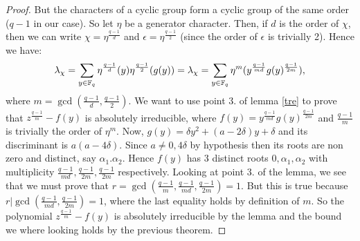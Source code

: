 \begin{cor}
\begin{proof}
But the characters of a cyclic group form a cyclic group of the same order ($q-1$ in our case). So let $\eta$ be a generator character.
Then, if $d$ is the order of $\chi$, then we can write $\chi=\eta^{\frac{q-1}{d}}$ and $\epsilon=\eta^{\frac{q-1}{2}}$
(since the order of $\epsilon$ is trivially 2). Hence we have:
\begin{equation}
	\lambda_{\chi}=\sum_{y \in {\mathbb F}_q} \eta^{\frac{q-1}{d}}(y)\eta^{\frac{q-1}{2}}(g(y))=\lambda_{\chi}=\sum_{y \in {\mathbb F}_q}
	\eta^m(y^{\frac{q-1}{md}}g(y)^{\frac{q-1}{2m}}),
\end{equation}
where $m=\gcd(\frac{q-1}{d},\frac{q-1}{2})$. We want to use point 3. of lemma \ref{tre} to prove that $z^{\frac{q-1}{m}}-f(y)$
is absolutely irreducible, where $f(y)=y^{\frac{q-1}{md}}g(y)^{\frac{q-1}{2m}}$ and $\frac{q-1}{m}$ is trivially the order
of $\eta^m$. Now, $g(y)=\delta y^2+(a-2\delta)y+\delta$
and its discriminant is $a(a-4\delta)$. Since $a\neq 0, 4\delta$ by hypothesis then its roots are non zero
and distinct, say $\alpha_1. \alpha_2$. Hence $f(y)$ has 3 distinct roots $0,\alpha_1,\alpha_2$ with multiplicity 
$\frac{q-1}{md}, \frac{q-1}{2m},\frac{q-1}{2m}$ respectively.
Looking at point 3. of the lemma, we see that we must prove that $r=\gcd(\frac{q-1}{m},\frac{q-1}{md},\frac{q-1}{2m})=1$.
But this is true because $r\vert \gcd(\frac{q-1}{md},\frac{q-1}{2m})=1$, where the last equality holds by definition of $m$.
So the polynomial $z^{\frac{q-1}{m}}-f(y)$ is absolutely irreducible by the lemma and the bound we where looking holds 
by the previous theorem.
\end{proof}
\end{cor}